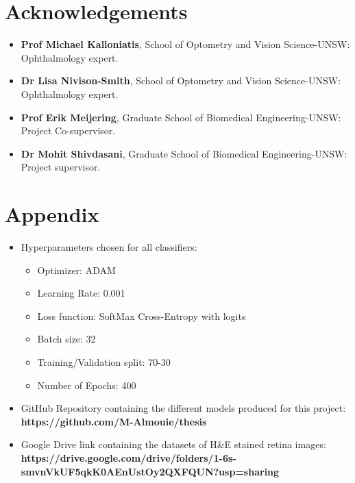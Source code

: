 \documentclass[a4paper]{article}
\begin{document}
\pagebreak



\section{Acknowledgements}
    \begin{itemize}
        \item \textbf{Prof Michael Kalloniatis}, School of Optometry and Vision Science-UNSW: Ophthalmology expert.
        \item \textbf{Dr Lisa Nivison-Smith}, School of Optometry and Vision Science-UNSW: Ophthalmology expert.
        \item \textbf{Prof Erik Meijering}, Graduate School of Biomedical Engineering-UNSW: Project Co-supervisor.
        \item \textbf{Dr Mohit Shivdasani}, Graduate School of Biomedical Engineering-UNSW: Project supervisor.   
    \end{itemize}
\section{Appendix}
    \begin{itemize}
        \item Hyperparameters chosen for all classifiers:
            \begin{itemize}
                \item Optimizer: ADAM
                \item Learning Rate: 0.001
                \item Loss function: SoftMax Cross-Entropy with logits
                \item Batch size: 32
                \item Training/Validation split: 70-30
                \item Number of Epochs: 400
            \end{itemize}
        \item GitHub Repository containing the different models produced for this project: \\
                \textbf{https://github.com/M-Almouie/thesis} 
        \item Google Drive link containing the datasets of H\&E stained retina images:\\
                \textbf{https://drive.google.com/drive/folders/1-6s-smvnVkUF5qkK0AEnUstOy2QXFQUN?usp=sharing}
    \end{itemize}
\end{document}
